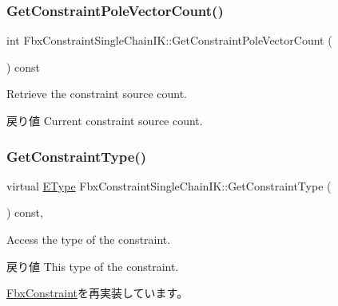 \subsubsection{\texorpdfstring{Get\+Constraint\+Pole\+Vector\+Count()}{GetConstraintPoleVectorCount()}}
{\footnotesize\ttfamily int Fbx\+Constraint\+Single\+Chain\+I\+K\+::\+Get\+Constraint\+Pole\+Vector\+Count (\begin{DoxyParamCaption}{ }\end{DoxyParamCaption}) const}

Retrieve the constraint source count. \begin{DoxyReturn}{戻り値}
Current constraint source count. 
\end{DoxyReturn}
\mbox{\label{class_fbx_constraint_single_chain_i_k_adc9d38f5ae55bf9c6415334a81cbdffb}} 
\subsubsection{\texorpdfstring{Get\+Constraint\+Type()}{GetConstraintType()}}
{\footnotesize\ttfamily virtual \hyperlink{class_fbx_constraint_a49c1634663395eab7c28856df233ec66}{E\+Type} Fbx\+Constraint\+Single\+Chain\+I\+K\+::\+Get\+Constraint\+Type (\begin{DoxyParamCaption}{ }\end{DoxyParamCaption}) const\hspace{0.3cm}{\ttfamily [protected]}, {\ttfamily [virtual]}}

Access the type of the constraint. \begin{DoxyReturn}{戻り値}
This type of the constraint. 
\end{DoxyReturn}


\hyperlink{class_fbx_constraint_adbeea66a1a605531a019aa6df90dc45b}{Fbx\+Constraint}を再実装しています。

\mbox{\label{class_fbx_constraint_single_chain_i_k_ac4c0052ea23d8e9a144bd9439cee2507}} 
